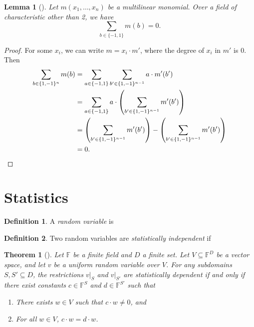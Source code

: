 \documentclass[english]{reedthesis}
\theoremstyle{plain}
\newtheorem{thm}{Theorem}[section]
\newtheorem{lemma}[lemma]{Lemma}
\theoremstyle{definition}
\newtheorem{defn}[defn]{Definition}
\theoremstyle{remark}
\begin{document}

\begin{lemma}[{\cite[Lemma 7]{JKRS09}}]\label{lem:monomial-sum}
  Let $m(x_{1}, \ldots, x_{n})$ be a multilinear monomial. Over a field of
  characteristic other than 2, we have
  \begin{equation}
    \sum_{b \in \{-1, 1\}}m(b) = 0.
  \end{equation}
\end{lemma}

\begin{proof}
  For some $x_{i}$, we can write $m = x_{i} \cdot m'$, where the degree of $x_{i}$
  in $m'$ is 0. Then
  \begin{align*}
    \sum_{b \in \{1, -1\}^{n}}m(b)
    &= \sum_{a \in \{-1, 1\}}\sum_{b' \in \{1, -1\}^{n-1}}a \cdot m'(b') \\
    &= \sum_{a \in \{-1, 1\}} a \cdot \mleft(\sum_{b' \in \{1, -1\}^{n-1}} m'(b')\mright) \\
    &= \mleft(\sum_{b' \in \{1, -1\}^{n-1}} m'(b')\mright) - \mleft(\sum_{b' \in \{1, -1\}^{n-1}} m'(b')\mright) \\
    &= 0.
  \end{align*}
\end{proof}

\section{Statistics}

\begin{defn}\label{def:random-var}
  A \emph{random variable} is %
\end{defn}

\begin{defn}\label{def:stat-indep}
  Two random variables are \emph{statistically independent} if
\end{defn}



\begin{thm}[{\cite[Claim 2]{CFGS22}}]\label{thm:lin-indep-stat-indep}
  Let $\mathbb{F}$ be a finite field and $D$ a finite set. Let
  $V \subseteq \mathbb{F}^{D}$ be a vector space, and let $v$ be a uniform random
  variable over $V$. For any subdomains $S, S' \subseteq D$, the restrictions $v|_{S}$
  and $v|_{S'}$ are statistically dependent if and only if there exist constants
  $c \in \mathbb{F}^{S}$ and $d \in \mathbb{F}^{S'}$ such that
  \begin{enumerate}
    \item There exists $w \in V$ such that $c \cdot w \ne 0$, and
    \item For all $w \in V$, $c \cdot w = d \cdot w$.
  \end{enumerate}
\end{thm}
\end{document}
